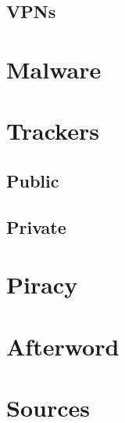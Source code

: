 \documentclass{article}
\begin{document}
	\subsection{VPNs}
\section{Malware}
\section{Trackers}
	\subsection{Public}
	\subsection{Private}
\section{Piracy}
\section{Afterword}
\section{Sources}
\end{document}
